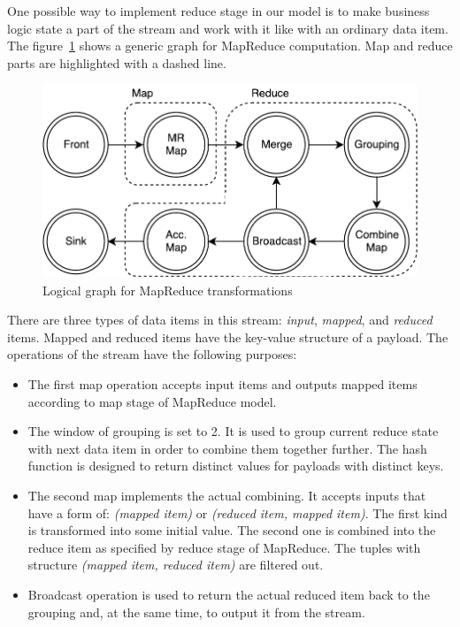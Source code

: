 One possible way to implement reduce stage in our model is to make business logic state a part of the stream and work with it like with an ordinary data item. The figure~\ref{mapreduce-graph-figure} shows a generic graph for MapReduce computation. Map and reduce parts are highlighted with a dashed line.

\begin{figure}[htb]
  \centering
  \includegraphics[scale=0.5]{pics/mapreduce}
  \caption{Logical graph for MapReduce transformations}
  \label {mapreduce-graph-figure}
\end{figure}

There are three types of data items in this stream: {\it input}, {\it mapped}, and {\it reduced} items. Mapped and reduced items have the key-value structure of a payload. The operations of the stream have the following purposes:

\begin{itemize}
  \item The first map operation accepts input items and outputs mapped items according to map stage of MapReduce model.
  \item The window of grouping is set to 2. It is used to group current reduce state with next data item in order to combine them together further. The hash function is designed to return distinct values for payloads with distinct keys.
  \item The second map implements the actual combining. It accepts inputs that have a form of: \textit{(mapped item)} or \textit{(reduced item, mapped item)}. The first kind is transformed into some initial value. The second one is combined into the reduce item as specified by reduce stage of MapReduce. The tuples with structure \textit{(mapped item, reduced item)} are filtered out.
  \item Broadcast operation is used to return the actual reduced item back to the grouping and, at the same time, to output it from the stream. 
\end{itemize}

